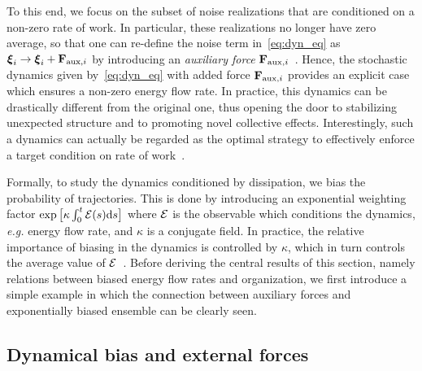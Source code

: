 \documentclass[superscriptaddress, twocolumn, prx, longbibliography, nofootinbib]{revtex4-1}
\begin{document}
To this end, we focus on the subset of noise realizations that are conditioned on a non-zero rate of work. In particular, these realizations no longer have zero average, so that one can re-define the noise term in~\eqref{eq:dyn_eq} as ${\boldsymbol \xi}_i \to {\boldsymbol \xi}_i + {\bf F}_{{\rm aux},i}$ by introducing an {\it auxiliary force} ${\bf F}_{{\rm aux},i}$~\cite{Jack2010, Chetrite2013}. Hence, the stochastic dynamics given by~\eqref{eq:dyn_eq} with added force ${\bf F}_{{\rm aux},i}$ provides an explicit case which ensures a non-zero energy flow rate. In practice, this dynamics can be drastically different from the original one, thus opening the door to stabilizing unexpected structure and to promoting novel collective effects. Interestingly, such a dynamics can actually be regarded as the optimal strategy to effectively enforce a target condition on rate of work~\cite{Evans2004PRL}.


Formally, to study the dynamics conditioned by dissipation, we bias the probability of trajectories. This is done by introducing an exponential weighting factor $\exp\big[\kappa\int_0^t{\cal E}(s){\rm d}s\big]$ where ${\cal E}$ is the observable which conditions the dynamics, {\it e.g.} energy flow rate, and $\kappa$ is a conjugate field. In practice, the relative importance of biasing in the dynamics is controlled by $\kappa$, which in turn controls the average value of $\cal E$~\cite{Touchette2009}. Before deriving the central results of this section, namely relations between biased energy flow rates and organization, we first introduce a simple example in which the connection between auxiliary forces and exponentially biased ensemble can be clearly seen.




\subsection{Dynamical bias and external forces}\label{sec:biasexternal}
\end{document}
